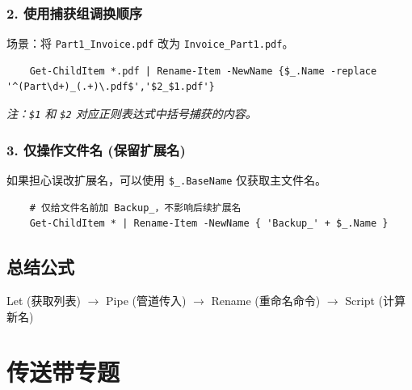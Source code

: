 \documentclass[CJKmath=true,10pt]{MyBook}
\begin{document}
\subsection{2. 使用捕获组调换顺序}
场景：将 \texttt{Part1\_Invoice.pdf} 改为 \texttt{Invoice\_Part1.pdf}。
\begin{lstlisting}
	Get-ChildItem *.pdf | Rename-Item -NewName {$_.Name -replace '^(Part\d+)_(.+)\.pdf$','$2_$1.pdf'}
\end{lstlisting}
\textit{注：\texttt{\$1} 和 \texttt{\$2} 对应正则表达式中括号捕获的内容。}

\subsection{3. 仅操作文件名 (保留扩展名)}
如果担心误改扩展名，可以使用 \texttt{\$\_.BaseName} 仅获取主文件名。
\begin{lstlisting}
	# 仅给文件名前加 Backup_，不影响后续扩展名
	Get-ChildItem * | Rename-Item -NewName { 'Backup_' + $_.Name }
\end{lstlisting}

\section{总结公式}
\begin{tcolorbox}[colback=blue!5!white,colframe=blue!75!black,title=记忆口诀]
	Let (获取列表) $\rightarrow$ Pipe (管道传入) $\rightarrow$ Rename (重命名命令) $\rightarrow$ Script (计算新名)
\end{tcolorbox}

\chapter{传送带专题}
\end{document}
